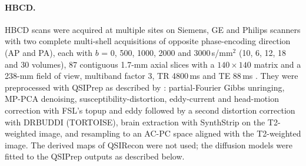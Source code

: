 \documentclass[11pt]{article}
\begin{document}
\paragraph{HBCD.} HBCD scans were acquired at multiple sites on Siemens, GE and Philips scanners with two complete
multi-shell acquisitions of opposite phase-encoding direction (AP and PA), each with $b$ = 0, 500, 1000, 2000 and
3000\,s/mm$^2$ (10, 6, 12, 18 and 30 volumes), 87 contiguous 1.7-mm axial slices with a $140\times140$ matrix and a 238-mm field of view, multiband factor 3, TR 4800\,ms and TE 88\,ms
\citep{dean2024hbcdmri,cieslak2025hbcd}. They were preprocessed with QSIPrep as described by \citet{cieslak2025hbcd}:
partial-Fourier Gibbs unringing, MP-PCA denoising, susceptibility-distortion, eddy-current and head-motion correction
with FSL's topup and eddy followed by a second distortion correction with DRBUDDI (TORTOISE), brain extraction with
SynthStrip on the T2-weighted image, and resampling to an AC-PC space aligned with the T2-weighted image. The derived
maps of QSIRecon were not used; the diffusion models were fitted to the QSIPrep outputs as described below.
\end{document}
